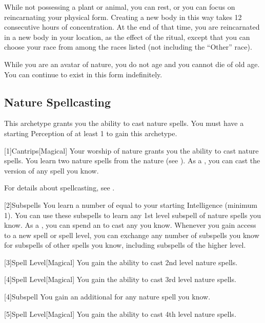         While not possessing a plant or animal, you can rest, or you can focus on reincarnating your physical form.
        Creating a new body in this way takes 12 consecutive hours of concentration.
        At the end of that time, you are reincarnated in a new body in your location, as the effect of the  ritual, except that you can choose your race from among the races listed (not including the ``Other'' race).

        While you are an avatar of nature, you do not age and you cannot die of old age.
        You can continue to exist in this form indefinitely.

    \subsection{Nature Spellcasting}
        This archetype grants you the ability to cast nature spells.
        You must have a starting Perception of at least 1 to gain this archetype.

        [1]{Cantrips}[Magical]
        Your worship of nature grants you the ability to cast nature spells.
        You learn two nature spells from the nature  (see ).
        As a , you can cast the  version of any spell you know.

        For details about spellcasting, see .

        [2]{Subspells} You learn a number of  equal to your starting Intelligence  (minimum 1).
        You can use these subspells to learn any 1st level subspell of nature spells you know.
        As a , you can spend an  to cast any  you know.
        Whenever you gain access to a new spell or spell level, you can exchange any number of subspells you know for subspells of other spells you know, including subspells of the higher level.

        [3]{Spell Level}[Magical] You gain the ability to cast 2nd level nature spells.

        [4]{Spell Level}[Magical] You gain the ability to cast 3rd level nature spells.

        [4]{Subspell} You gain an additional  for any nature spell you know.

        [5]{Spell Level}[Magical] You gain the ability to cast 4th level nature spells.

